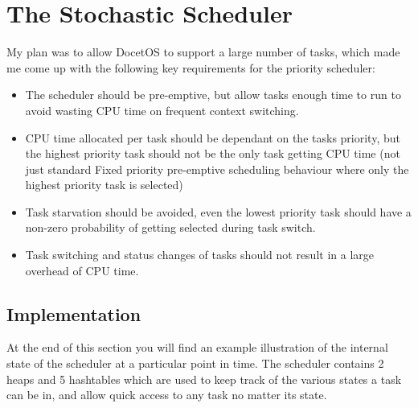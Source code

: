\documentclass[12pt,a4paper]{article}
\begin{document}
\section{The Stochastic Scheduler}
My plan was to allow DocetOS to support a large number of tasks, which made me come up with the following key requirements for the priority scheduler:
\begin{itemize}
  \item The scheduler should be pre-emptive, but allow tasks enough time to run to avoid wasting CPU time on frequent context switching.
  \item CPU time allocated per task should be dependant on the tasks priority, but the highest priority task should not be the only task getting CPU time (not just standard Fixed priority pre-emptive scheduling behaviour where only the highest priority task is selected)
  \item Task starvation should be avoided, even the lowest priority task should have a non-zero probability of getting selected during task switch.
  \item Task switching and status changes of tasks should not result in a large overhead of CPU time.
\end{itemize}

\pagebreak
\subsection{Implementation}
At the end of this section you will find an example illustration of the internal state of the scheduler at a particular point in time. The scheduler contains 2 heaps and 5 hashtables which are used to keep track of the various states a task can be in, and allow quick access to any task no matter its state.
\end{document}
